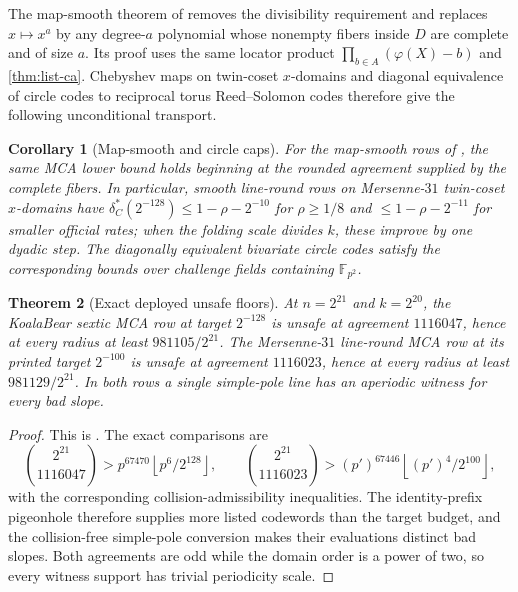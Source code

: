 \documentclass[11pt,a4paper]{amsart}
\numberwithin{equation}{section}
\newtheorem{theorem}{Theorem}[section]
\newtheorem{corollary}[theorem]{Corollary}
\theoremstyle{remark}
\newcommand{\F}{\mathbb F}
\newcommand{\floor}[1]{\left\lfloor#1\right\rfloor}
\begin{document}
The map-smooth theorem of \cite{ChoCap26} removes the divisibility requirement and replaces $x\mapsto x^a$ by any degree-$a$ polynomial whose nonempty fibers inside $D$ are complete and of size $a$.  Its proof uses the same locator product $\prod_{b\in A}(\varphi(X)-b)$ and \cref{thm:list-ca}.  Chebyshev maps on twin-coset $x$-domains and diagonal equivalence of circle codes to reciprocal torus Reed--Solomon codes therefore give the following unconditional transport.

\begin{corollary}[Map-smooth and circle caps]\label{cor:circle-cap}
For the map-smooth rows of \cite[Theorem ``universal cap for map-smooth domains'']{ChoCap26}, the same MCA lower bound holds beginning at the rounded agreement supplied by the complete fibers.  In particular, smooth line-round rows on Mersenne-$31$ twin-coset $x$-domains have $\delta_C^*(2^{-128})\le1-\rho-2^{-10}$ for $\rho\ge1/8$ and $\le1-\rho-2^{-11}$ for smaller official rates; when the folding scale divides $k$, these improve by one dyadic step.  The diagonally equivalent bivariate circle codes satisfy the corresponding bounds over challenge fields containing $\F_{p^2}$.
\end{corollary}

\begin{theorem}[Exact deployed unsafe floors]\label{thm:deployed-unsafe}
At $n=2^{21}$ and $k=2^{20}$, the KoalaBear sextic MCA row at target $2^{-128}$ is unsafe at agreement $1116047$, hence at every radius at least $981105/2^{21}$.  The Mersenne-$31$ line-round MCA row at its printed target $2^{-100}$ is unsafe at agreement $1116023$, hence at every radius at least $981129/2^{21}$.  In both rows a single simple-pole line has an aperiodic witness for every bad slope.
\end{theorem}

\begin{proof}
This is \cite[Proposition ``moved MCA frontier, exact'' and Corollary ``deployed MCA frontier floors'']{ChoCap26}.  The exact comparisons are
\[
 \binom{2^{21}}{1116047}>
 p^{67470}\floor{p^6/2^{128}},\qquad
 \binom{2^{21}}{1116023}>
 (p')^{67446}\floor{(p')^4/2^{100}},
\]
with the corresponding collision-admissibility inequalities.  The identity-prefix pigeonhole therefore supplies more listed codewords than the target budget, and the collision-free simple-pole conversion makes their evaluations distinct bad slopes.  Both agreements are odd while the domain order is a power of two, so every witness support has trivial periodicity scale.
\end{proof}
\end{document}
